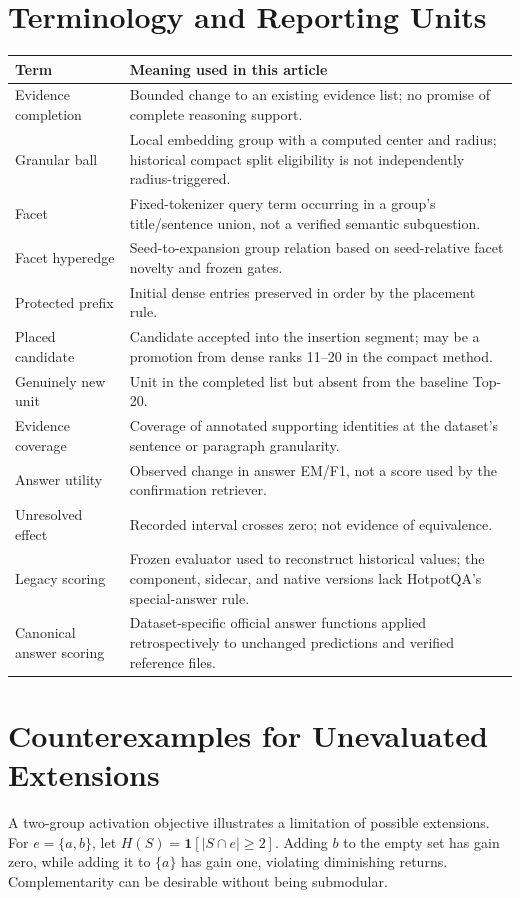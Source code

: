 \documentclass[11pt,a4paper]{article}
\begin{document}
\section{Terminology and Reporting Units}
\begin{longtable}{@{}p{}p{}@{}}
\toprule
Term & Meaning used in this article\\
\midrule
\endhead
Evidence completion & Bounded change to an existing evidence list; no promise
of complete reasoning support.\\
Granular ball & Local embedding group with a computed center and radius;
historical compact split eligibility is not independently radius-triggered.\\
Facet & Fixed-tokenizer query term occurring in a group's title/sentence union,
not a verified semantic subquestion.\\
Facet hyperedge & Seed-to-expansion group relation based on seed-relative
facet novelty and frozen gates.\\
Protected prefix & Initial dense entries preserved in order by the placement rule.\\
Placed candidate & Candidate accepted into the insertion segment; may be a
promotion from dense ranks 11--20 in the compact method.\\
Genuinely new unit & Unit in the completed list but absent from the baseline Top-20.\\
Evidence coverage & Coverage of annotated supporting identities at the
dataset's sentence or paragraph granularity.\\
Answer utility & Observed change in answer EM/F1, not a score used by the
confirmation retriever.\\
Unresolved effect & Recorded interval crosses zero; not evidence of equivalence.\\
Legacy scoring & Frozen evaluator used to reconstruct historical values;
the component, sidecar, and native versions lack HotpotQA's special-answer rule.\\
Canonical answer scoring & Dataset-specific official answer functions applied
retrospectively to unchanged predictions and verified reference files.\\
\bottomrule
\end{longtable}
\section{Counterexamples for Unevaluated Extensions}
A two-group activation objective illustrates a limitation of possible
extensions. For $e=\{a,b\}$, let $H(S)=\mathbf{1}[|S\cap e|\geq2]$.
Adding $b$ to the empty set has gain zero, while adding it to $\{a\}$ has gain
one, violating diminishing returns. Complementarity can be desirable without
being submodular.
\end{document}
